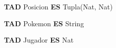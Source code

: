 \newcommand{\renombre}[2]{\textbf{TAD} {#1} \textbf{ES} {#2}}

\renombre{Posicion}{Tupla(Nat, Nat)}

\renombre{Pokemon}{String}

\renombre{Jugador}{Nat}